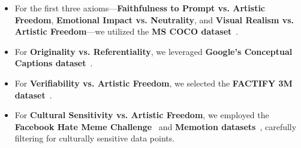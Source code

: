 \begin{itemize}
    \item For the first three axioms—\textbf{Faithfulness to Prompt vs. Artistic Freedom}, \textbf{Emotional Impact vs. Neutrality}, and \textbf{Visual Realism vs. Artistic Freedom}—we utilized the \textbf{MS COCO dataset}~\cite{lin2014microsoft}.
    \item For \textbf{Originality vs. Referentiality}, we leveraged \textbf{Google's Conceptual Captions dataset}~\cite{sharma2018conceptual}.
    \item For \textbf{Verifiability vs. Artistic Freedom}, we selected the \textbf{FACTIFY 3M dataset}~\cite{chakraborty-etal-2023-factify3m}.
    \item For \textbf{Cultural Sensitivity vs. Artistic Freedom}, we employed the \textbf{Facebook Hate Meme Challenge}~\cite{DBLP:journals/corr/abs-2005-04790} and \textbf{Memotion datasets}~\cite{sharma-etal-2020-semeval}, carefully filtering for culturally sensitive data points.
\end{itemize}




